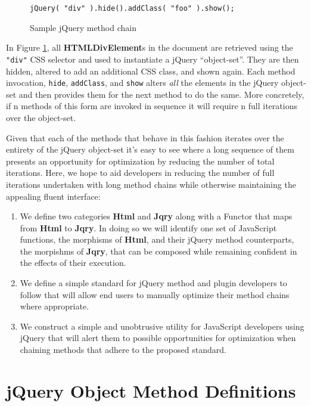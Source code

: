 \documentclass[preprint,10pt]{sigplanconf}
\begin{document}
\begin{figure}[h!]
\small
\begin{verbatim}
jQuery( "div" ).hide().addClass( "foo" ).show();
\end{verbatim}
\nocaptionrule \caption{Sample jQuery method chain}
\label{fig:jquery-sample}
\end{figure}

In Figure \ref{fig:jquery-sample}, all \textbf{HTMLDivElement}s in the document are retrieved using the \verb|"div"| CSS selector and used to instantiate a jQuery ``object-set''. They are then hidden, altered to add an additional CSS class, and shown again. Each method invocation, \verb|hide|, \verb|addClass|, and \verb|show| alters \textit{all} the elements in the jQuery object-set and then provides them for the next method to do the same. More concretely, if n methods of this form are invoked in sequence it will require n full iterations over the object-set.

Given that each of the methods that behave in this fashion iterates over the entirety of the jQuery object-set it's easy to see where a long sequence of them presents an opportunity for optimization by reducing the number of total iterations. Here, we hope to aid developers in reducing the number of full iterations undertaken with long method chains while otherwise maintaining the appealing fluent interface:

\begin{enumerate}
\item We define two categories \textbf{Html} and \textbf{Jqry} along with a Functor that maps from \textbf{Html} to \textbf{Jqry}. In doing so we will identify one set of JavaScript functions, the morphisms of \textbf{Html}, and their jQuery method counterparts, the morpishms of \textbf{Jqry}, that can be composed while remaining confident in the effects of their execution.
\item We define a simple standard for jQuery method and plugin developers to follow that will allow end users to manually optimize their method chains where appropriate.
\item We construct a simple and unobtrusive utility for JavaScript developers using jQuery that will alert them to possible opportunities for optimization when chaining methods that adhere to the proposed standard.
\end{enumerate}

\section{jQuery Object Method Definitions}
\end{document}
